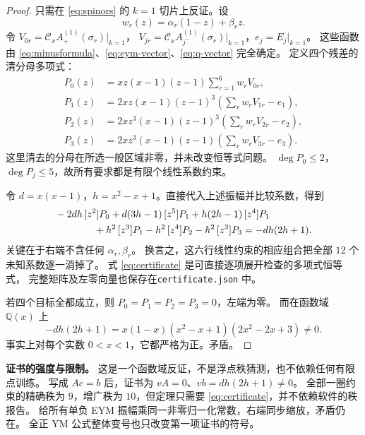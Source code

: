 \documentclass[UTF8,a4paper,11pt,fontset=fandol]{ctexart}
\newcommand{\Cx}{\mathcal C_x}
\newcommand{\QQ}{\mathbb Q}
\newcommand{\coeff}[2]{[z^{#1}]#2}
\begin{document}
\begin{proof}
只需在 \eqref{eq:spinors} 的 $k=1$ 切片上反证。设
\begin{equation}
 w_r(z)=\alpha_r(1-z)+\beta_rz.
\end{equation}
令 $V_{0r}=\Cx A^{(1)}_+(\sigma_r)|_{k=1}$，
$V_{jr}=\Cx A^{(1)}_{j^-}(\sigma_r)|_{k=1}$，$e_j=E_j|_{k=1}$。
这些函数由 \eqref{eq:minusformula}、\eqref{eq:eym-vector}、\eqref{eq:q-vector} 完全确定。
定义四个残差的清分母多项式：
\begin{align}
 P_0(z)&=xz(x-1)(z-1)\sum_{r=1}^6w_rV_{0r},\\
 P_1(z)&=2xz(x-1)(z-1)^3\left(\sum_rw_rV_{1r}-e_1\right),\\
 P_2(z)&=2xz^3(x-1)(z-1)^3\left(\sum_rw_rV_{2r}-e_2\right),\\
 P_3(z)&=2xz^3(x-1)(z-1)\left(\sum_rw_rV_{3r}-e_3\right).
\label{eq:polys}
\end{align}
这里清去的分母在所选一般区域非零，并未改变恒等式问题。
$\deg P_0\le2$，$\deg P_j\le5$，故所有要求都是有限个线性系数约束。

令 $d=x(x-1)$，$h=x^2-x+1$。直接代入上述振幅并比较系数，得到
\begin{align}
 &-2dh\,\coeff{2}{P_0}
 +d(3h-1)\,\coeff{5}{P_1}
 +h(2h-1)\,\coeff{4}{P_1}\notag\\
 &\hspace{14mm}
 +h^2\,\coeff{3}{P_1}
 -h^2\,\coeff{4}{P_2}
 -h^2\,\coeff{3}{P_3}
 =-dh(2h+1).
\label{eq:certificate}
\end{align}
关键在于右端不含任何 $\alpha_r,\beta_r$。
换言之，这六行线性约束的相应组合把全部 $12$ 个未知系数逐一消掉了。
式 \eqref{eq:certificate} 是可直接逐项展开检查的多项式恒等式，
完整矩阵及左零向量也保存在\allowbreak\nolinkurl{certificate.json} 中。

若四个目标全都成立，则 $P_0=P_1=P_2=P_3=0$，左端为零。
而在函数域 $\QQ(x)$ 上
\begin{equation}
 -dh(2h+1)
 =x(1-x)(x^2-x+1)(2x^2-2x+3)\ne0.
\end{equation}
事实上对每个实数 $0<x<1$，它都严格为正。矛盾。
\end{proof}

\textbf{证书的强度与限制。}
这是一个函数域反证，不是浮点秩猜测，也不依赖任何有限点训练。
写成 $A c=b$ 后，证书为 $vA=0$、$vb=dh(2h+1)\ne0$。
全部一圈约束的精确秩为 $9$，增广秩为 $10$，但定理只需要
\eqref{eq:certificate}，并不依赖软件的秩报告。
给所有单负 EYM 振幅乘同一非零归一化常数，右端同步缩放，矛盾仍在。
全正 YM 公式整体变号也只改变第一项证书的符号。
\end{document}
